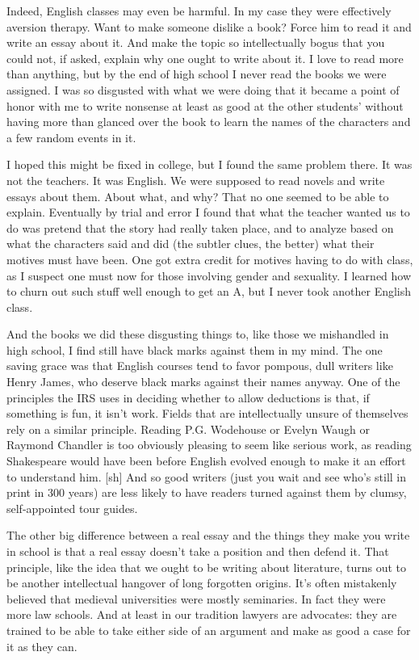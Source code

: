 Indeed, English classes may even be harmful.  In my case they
were effectively aversion therapy.  Want to make someone dislike
a book?  Force him to read it and write an essay about it.
And make the topic so intellectually bogus that you
could not, if asked, explain why one ought to write about it.
I love to read more than anything, but by the end of high school
I never read the books we were assigned.  I was so disgusted with
what we were doing that it became a point of honor
with me to write nonsense at least as good at the other students'
without having more than glanced over the book to learn the names
of the characters and a few random events in it.

I hoped this might be fixed in college, but I found the same
problem there.  It was not the teachers.  It was English.   
We were supposed to read novels and write essays about them.
About what, and why?  That no one seemed to be able to explain.
Eventually by trial and error I found that what the teacher  
wanted us to do was pretend that the story had really taken
place, and to analyze based on what the characters said and did (the
subtler clues, the better) what their motives must have been.
One got extra credit for motives having to do with class,
as I suspect one must now for those involving gender and  
sexuality.  I learned how to churn out such stuff well enough
to get an A, but I never took another English class.

And the books we did these disgusting things to, like those
we mishandled in high school, I find still have black marks
against them in my mind.  The one saving grace was that   
English courses tend to favor pompous, dull writers like
Henry James, who deserve black marks against their names anyway.
One of the principles the IRS uses in deciding whether to
allow deductions is that, if something is fun, it isn't work.
Fields that are intellectually unsure of themselves rely on
a similar principle.  Reading P.G. Wodehouse or Evelyn Waugh or
Raymond Chandler is too obviously pleasing to seem like
serious work, as reading Shakespeare would have been before 
English evolved enough to make it an effort to understand him. [sh]
And so good writers (just you wait and see who's still in
print in 300 years) are less likely to have readers turned   
against them by clumsy, self-appointed tour guides.


The other big difference between a real essay and the 
things
they make you write in school is that a real essay doesn't 
take a position and then defend it.  That principle,
like the idea that we ought to be writing about literature,   
turns out to be another intellectual hangover of long
forgotten origins.  It's often mistakenly believed that
medieval universities were mostly seminaries.  In fact they
were more law schools.  And at least in our tradition
lawyers are advocates: they are
trained to be able to
take
either side of an argument and make as good a case for it  
as they can. 

